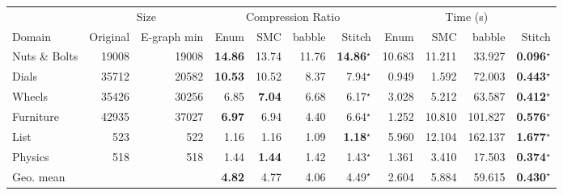 \begin{tabular}{l r r rrrr rrrr}
\toprule
& \multicolumn{2}{c}{Size} & \multicolumn{4}{c}{Compression Ratio} & \multicolumn{4}{c}{Time (s)} \\
\cmidrule(lr){2-3} \cmidrule(lr){4-7} \cmidrule(lr){8-11}
Domain & Original & E-graph min & Enum & SMC & babble & Stitch & Enum & SMC & babble & Stitch \\
\midrule
Nuts \& Bolts & 19008 & 19008 & \textbf{14.86} & 13.74 & 11.76 & \textbf{14.86}$^{\star}$ & 10.683 & 11.211 & 33.927 & \textbf{0.096}$^{\star}$ \\
Dials & 35712 & 20582 & \textbf{10.53} & 10.52 & 8.37 & 7.94$^{\star}$ & 0.949 & 1.592 & 72.003 & \textbf{0.443}$^{\star}$ \\
Wheels & 35426 & 30256 & 6.85 & \textbf{7.04} & 6.68 & 6.17$^{\star}$ & 3.028 & 5.212 & 63.587 & \textbf{0.412}$^{\star}$ \\
Furniture & 42935 & 37027 & \textbf{6.97} & 6.94 & 4.40 & 6.64$^{\star}$ & 1.252 & 10.810 & 101.827 & \textbf{0.576}$^{\star}$ \\
List & 523 & 522 & 1.16 & 1.16 & 1.09 & \textbf{1.18}$^{\star}$ & 5.960 & 12.104 & 162.137 & \textbf{1.677}$^{\star}$ \\
Physics & 518 & 518 & 1.44 & \textbf{1.44} & 1.42 & 1.43$^{\star}$ & 1.361 & 3.410 & 17.503 & \textbf{0.374}$^{\star}$ \\
\midrule
Geo. mean &  &  & \textbf{4.82} & 4.77 & 4.06 & 4.49$^{\star}$ & 2.604 & 5.884 & 59.615 & \textbf{0.430}$^{\star}$ \\
\bottomrule
\end{tabular}
